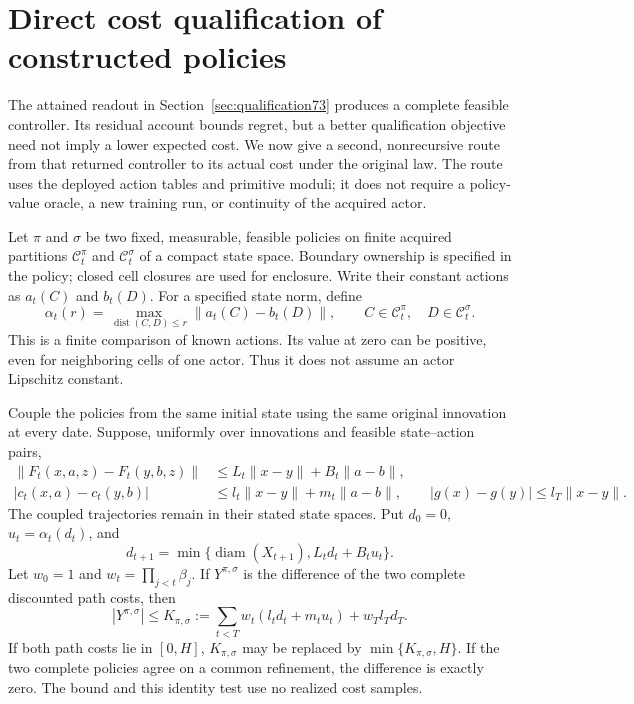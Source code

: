 \section{Direct cost qualification of constructed policies}\label{sec:policycost74}
The attained readout in Section~\ref{sec:qualification73} produces a complete feasible controller. Its residual account bounds regret, but a better qualification objective need not imply a lower expected cost. We now give a second, nonrecursive route from that returned controller to its actual cost under the original law. The route uses the deployed action tables and primitive moduli; it does not require a policy-value oracle, a new training run, or continuity of the acquired actor.

Let $\pi$ and $\sigma$ be two fixed, measurable, feasible policies on finite acquired partitions $\mathcal C_t^\pi$ and $\mathcal C_t^\sigma$ of a compact state space. Boundary ownership is specified in the policy; closed cell closures are used for enclosure. Write their constant actions as $a_t(C)$ and $b_t(D)$. For a specified state norm, define
\begin{equation}\label{eq:actionmod74}
 \alpha_t(r)=\max_{\operatorname{dist}(C,D)\le r}
                  \|a_t(C)-b_t(D)\|,
 \qquad C\in\mathcal C_t^\pi,\quad D\in\mathcal C_t^\sigma.
\end{equation}
This is a finite comparison of known actions. Its value at zero can be positive, even for neighboring cells of one actor. Thus it does not assume an actor Lipschitz constant.

\begin{theorem}\label{thm:displacement74}
Couple the policies from the same initial state using the same original innovation at every date. Suppose, uniformly over innovations and feasible state--action pairs,
\begin{align*}
 \|F_t(x,a,z)-F_t(y,b,z)\|&\le L_t\|x-y\|+B_t\|a-b\|,\\
 |c_t(x,a)-c_t(y,b)|&\le l_t\|x-y\|+m_t\|a-b\|,
 \qquad |g(x)-g(y)|\le l_T\|x-y\|.
\end{align*}
The coupled trajectories remain in their stated state spaces. Put $d_0=0$, $u_t=\alpha_t(d_t)$, and
\[
 d_{t+1}=\min\{\operatorname{diam}(X_{t+1}),L_td_t+B_tu_t\}.
\]
Let $w_0=1$ and $w_t=\prod_{j<t}\beta_j$. If $Y^{\pi,\sigma}$ is the difference of the two complete discounted path costs, then
\begin{equation}\label{eq:pathsupport74}
 |Y^{\pi,\sigma}|\le
 K_{\pi,\sigma}:=\sum_{t<T}w_t(l_td_t+m_tu_t)+w_Tl_Td_T.
\end{equation}
If both path costs lie in $[0,H]$, $K_{\pi,\sigma}$ may be replaced by $\min\{K_{\pi,\sigma},H\}$. If the two complete policies agree on a common refinement, the difference is exactly zero. The bound and this identity test use no realized cost samples.
\end{theorem}

